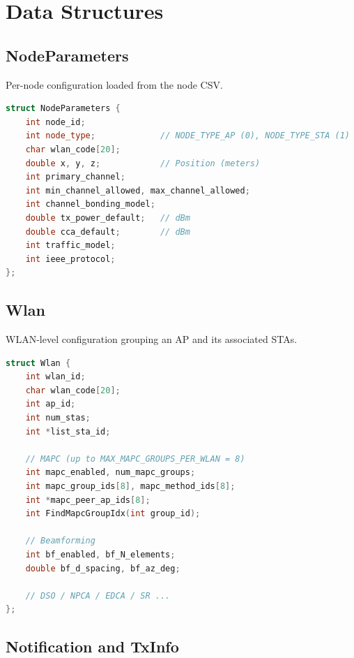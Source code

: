 \documentclass[11pt,a4paper]{article}
\begin{document}
\section{Data Structures}
\label{sec:structs}

\subsection{NodeParameters}

Per-node configuration loaded from the node CSV.

\begin{lstlisting}[language=C++,caption={NodeParameters (key fields)}]
struct NodeParameters {
    int node_id;
    int node_type;             // NODE_TYPE_AP (0), NODE_TYPE_STA (1)
    char wlan_code[20];
    double x, y, z;            // Position (meters)
    int primary_channel;
    int min_channel_allowed, max_channel_allowed;
    int channel_bonding_model;
    double tx_power_default;   // dBm
    double cca_default;        // dBm
    int traffic_model;
    int ieee_protocol;
};
\end{lstlisting}

\subsection{Wlan}

WLAN-level configuration grouping an AP and its associated STAs.

\begin{lstlisting}[language=C++,caption={Wlan (key fields)}]
struct Wlan {
    int wlan_id;
    char wlan_code[20];
    int ap_id;
    int num_stas;
    int *list_sta_id;

    // MAPC (up to MAX_MAPC_GROUPS_PER_WLAN = 8)
    int mapc_enabled, num_mapc_groups;
    int mapc_group_ids[8], mapc_method_ids[8];
    int *mapc_peer_ap_ids[8];
    int FindMapcGroupIdx(int group_id);

    // Beamforming
    int bf_enabled, bf_N_elements;
    double bf_d_spacing, bf_az_deg;

    // DSO / NPCA / EDCA / SR ...
};
\end{lstlisting}

\subsection{Notification and TxInfo}
\end{document}
